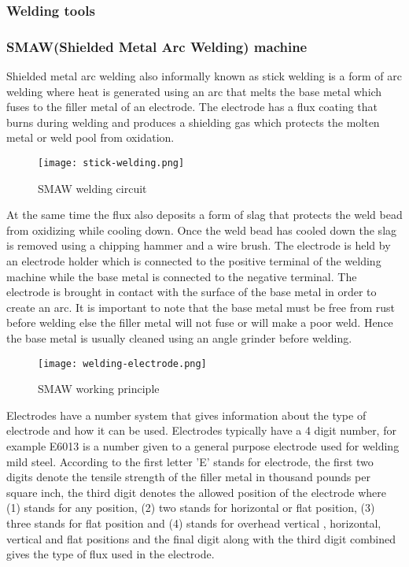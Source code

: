 \documentclass[a4paper,12pt]{article}
\begin{document}
			\newpage
			\subsubsection{Welding tools}
				\subsubsection*{SMAW(Shielded Metal Arc Welding) machine}
				
				Shielded metal arc welding also informally known as stick welding is a form of arc welding where heat is generated using an arc that melts the base metal which fuses to the filler metal of an electrode.
				The electrode has a flux coating that burns during welding and produces a shielding gas which protects the molten metal or weld pool from oxidation.
				
						\begin{figure}[H]
							\centering				
							\texttt{[image: stick-welding.png]}				
							\caption{SMAW welding circuit \citep{stick-welding-circuit}}
							\label{fig:smaw-welding-circuit}
						\end{figure}
				
				At the same time the flux also deposits a form of slag that protects the weld bead from oxidizing while cooling down. 
				Once the weld bead has cooled down the slag is removed using a chipping hammer and a wire brush.
				The electrode is held by an electrode holder which is connected to the positive terminal of the welding machine while the base metal is connected to the negative terminal.
				The electrode is brought in contact with the surface of the base metal in order to create an arc.
				It is important to note that the base metal must be free from rust before welding else the filler metal will not fuse or will make a poor weld.
				Hence the base metal is usually cleaned using an angle grinder before welding.
				\\
						\begin{figure}[H]
							\centering				
							\texttt{[image: welding-electrode.png]}				
							\caption{SMAW working principle \citep{stick-welding-circuit}}
							\label{fig:smaw-working-principle}
						\end{figure}
						
				Electrodes have a number system that gives information about the type of electrode and how it can be used.
				Electrodes typically have a 4 digit number, for example E6013 is a number given to a general purpose electrode used for welding mild steel.
				According to \citep{stick-welding-circuit} the first letter 'E' stands for electrode, the first two digits denote the tensile strength of the filler metal in thousand pounds per square inch, the third digit denotes the allowed position of the electrode where (1) stands for any position, (2) two stands for horizontal or flat position, (3) three stands for flat position and (4) stands for overhead vertical , horizontal, vertical and flat positions and the final digit along with the third digit combined gives the type of flux used in the electrode.
				
\end{document}
